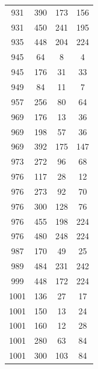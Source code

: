\documentclass[12pt]{amsproc} %
\theoremstyle{definition}\newtheorem{defn}[thm]{Definition}
\theoremstyle{definition}\newtheorem{rem}[thm]{Remark}
\theoremstyle{definition}\newtheorem{ex}[thm]{Example}
\begin{document}
\begin{table}[ht!]
\begin{minipage}{0.25\textwidth}
\begin{tabular}{c|c|c|c}
      931&390&173&156\\ 
      931&450&241&195\\ 
      935&448&204&224\\ 
      945&64&8&4\\ 
      945&176&31&33\\ 
      949&84&11&7\\ 
      957&256&80&64\\ 
      969&176&13&36\\ 
      969&198&57&36\\ 
      969&392&175&147\\ 
      973&272&96&68\\ 
      976&117&28&12\\ 
      976&273&92&70\\ 
      976&300&128&76\\ 
      976&455&198&224\\ 
      976&480&248&224\\ 
      987&170&49&25\\ 
      989&484&231&242\\ 
      999&448&172&224\\ 
      1001&136&27&17\\ 
      1001&150&13&24\\ 
      1001&160&12&28\\ 
      1001&280&63&84\\ 
      1001&300&103&84\\ 
        \end{tabular}
    \end{minipage}
\end{table}
\end{document}

